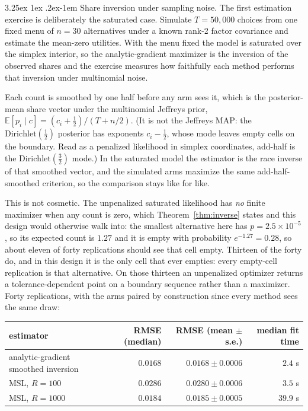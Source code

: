 \documentclass[11pt]{article}
\makeatletter
\renewcommand\paragraph{\@startsection{paragraph}{4}{\z@}%
  {3.25ex \@plus1ex \@minus.2ex}{-1em}%
  {\normalfont\normalsize\itshape}}
\makeatother
\begin{document}
\paragraph{Share inversion under sampling noise.} The first estimation
exercise is deliberately the saturated case. Simulate $T=50{,}000$ choices
from one fixed menu of $n=30$ alternatives under a known rank-2 factor
covariance and estimate the mean-zero utilities. With
the menu fixed the model is saturated over the simplex interior, so the
analytic-gradient maximizer is the inversion of the observed shares and the
exercise measures how faithfully each method performs that inversion
under multinomial noise.

Each count is smoothed by one half before any arm sees it, which is the
posterior-mean share vector under the multinomial Jeffreys prior,
$\mathbb{E}[p_i\mid c]=(c_i+\tfrac12)/(T+n/2)$. (It is not the Jeffreys
MAP: the $\mathrm{Dirichlet}(\tfrac12)$ posterior has exponents
$c_i-\tfrac12$, whose mode leaves empty cells on the boundary. Read as a
penalized likelihood in simplex coordinates, add-half is the
$\mathrm{Dirichlet}(\tfrac32)$ mode.) In the saturated model the estimator
is the race inverse of that smoothed vector, and the simulated arms
maximize the same add-half-smoothed criterion, so the comparison stays
like for like.

This is not cosmetic. The unpenalized saturated likelihood has \emph{no}
finite maximizer when any count is zero, which Theorem~\ref{thm:inverse}
states and this design would otherwise walk into: the smallest
alternative here has $p=2.5\times10^{-5}$, so its expected count is
$1.27$ and it is empty with probability $e^{-1.27}=0.28$, so about
eleven of forty replications should see that cell empty. Thirteen of the
forty do, and in this design it is the only cell that ever empties: every
empty-cell replication is that alternative. On those thirteen an
unpenalized optimizer returns a tolerance-dependent point on a boundary
sequence rather than a maximizer. Forty replications, with the arms paired by construction
since every method sees the same draw:

\begin{center}\small
\begin{tabular}{lrrr}
\toprule
estimator & RMSE (median) & RMSE (mean $\pm$ s.e.) & median fit time \\
\midrule
analytic-gradient smoothed inversion & $0.0168$ & $0.0168\pm0.0006$ & $2.4$ s \\
MSL, $R=100$ & $0.0286$ & $0.0280\pm0.0006$ & $3.5$ s \\
MSL, $R=1000$ & $0.0184$ & $0.0185\pm0.0005$ & $39.9$ s \\
\bottomrule
\end{tabular}
\end{center}
\end{document}
